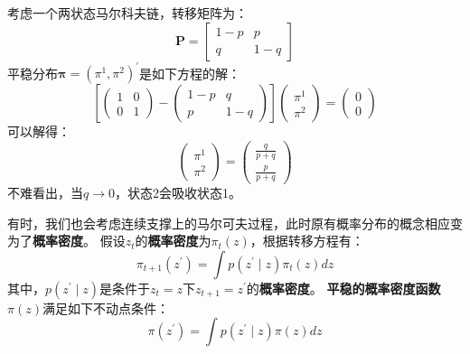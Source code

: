 \begin{example}
    考虑一个两状态马尔科夫链，转移矩阵为：
    \begin{equation*}
        \boldsymbol{P} = 
        \begin{bmatrix}
            1-p & p \\
            q & 1-q
        \end{bmatrix}
    \end{equation*}
    平稳分布$\boldsymbol{\pi}=\left(\pi^1, \pi^2\right)^{\prime}$是如下方程的解：
    \begin{equation*}
        \left[
            \begin{pmatrix}
                1 & 0 \\
                 0 & 1
            \end{pmatrix}
            -
            \begin{pmatrix}
                1-p & q \\
                p & 1-q
            \end{pmatrix}
        \right]
        \begin{pmatrix}
            \pi^1 \\
            \pi^2
        \end{pmatrix}
        =
        \begin{pmatrix}
            0 \\
            0
        \end{pmatrix}
    \end{equation*}
    可以解得：
    \begin{equation*}
        \begin{pmatrix}
            \pi^1 \\
            \pi^2
        \end{pmatrix}
        =
        \begin{pmatrix}
            \frac{q}{p+q} \\
            \frac{p}{p+q}
        \end{pmatrix}
    \end{equation*}
    不难看出，当$q\rightarrow 0$，状态2会吸收状态1。
\end{example}

有时，我们也会考虑连续支撑上的马尔可夫过程，此时原有概率分布的概念相应变为了\textbf{概率密度}。
假设$z_t$的\textbf{概率密度}为$\pi_t(z)$，根据转移方程有：
\begin{equation*}
    \pi_{t+1}\left(z^{\prime}\right)=\int p\left(z^{\prime} \mid z\right) \pi_t(z) dz
\end{equation*}
其中，$p\left(z^{\prime}\mid z\right)$是条件于$z_t=z$下$z_{t+1}=z^{\prime}$的\textbf{概率密度}。
\textbf{平稳的概率密度函数$\pi(z)$}满足如下不动点条件：
\begin{equation*}
    \pi(z^{\prime}) = \int  p\left(z^{\prime} \mid z\right) \pi(z) dz
\end{equation*}

